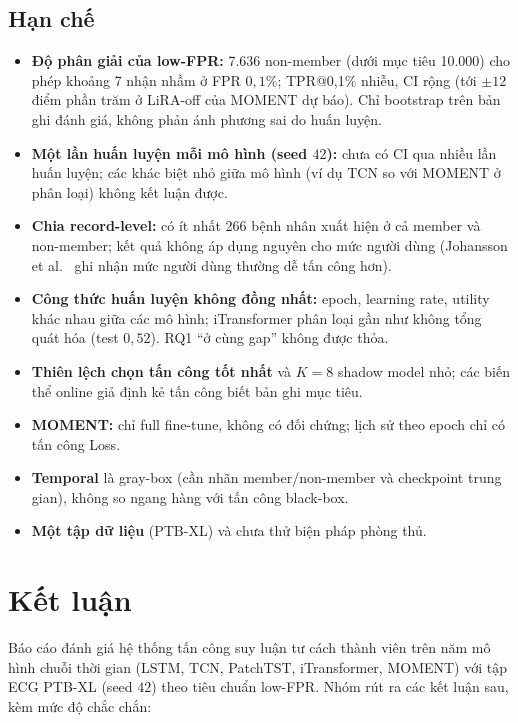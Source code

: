 \documentclass[12pt,a4paper]{report}
\begin{document}
\section{Hạn chế}
\label{sec:limitations}

\begin{itemize}
  \item \textbf{Độ phân giải của low-FPR:} 7.636 non-member (dưới mục tiêu 10.000) cho phép khoảng 7 nhận nhầm ở FPR $0{,}1\%$; TPR@0,1\% nhiễu, CI rộng (tới $\pm 12$ điểm phần trăm ở LiRA-off của MOMENT dự báo). Chỉ bootstrap trên bản ghi đánh giá, không phản ánh phương sai do huấn luyện.
  \item \textbf{Một lần huấn luyện mỗi mô hình (seed $42$):} chưa có CI qua nhiều lần huấn luyện; các khác biệt nhỏ giữa mô hình (ví dụ TCN so với MOMENT ở phân loại) không kết luận được.
  \item \textbf{Chia record-level:} có ít nhất 266 bệnh nhân xuất hiện ở cả member và non-member; kết quả không áp dụng nguyên cho mức người dùng (Johansson et al.\ \cite{johansson2025} ghi nhận mức người dùng thường dễ tấn công hơn).
  \item \textbf{Công thức huấn luyện không đồng nhất:} epoch, learning rate, utility khác nhau giữa các mô hình; iTransformer phân loại gần như không tổng quát hóa (test $0{,}52$). RQ1 ``ở cùng gap'' không được thỏa.
  \item \textbf{Thiên lệch chọn tấn công tốt nhất} và $K = 8$ shadow model nhỏ; các biến thể online giả định kẻ tấn công biết bản ghi mục tiêu.
  \item \textbf{MOMENT:} chỉ full fine-tune, không có đối chứng; lịch sử theo epoch chỉ có tấn công Loss.
  \item \textbf{Temporal} là gray-box (cần nhãn member/non-member và checkpoint trung gian), không so ngang hàng với tấn công black-box.
  \item \textbf{Một tập dữ liệu} (PTB-XL) và chưa thử biện pháp phòng thủ.
\end{itemize}

\chapter{Kết luận}
\label{chap:ketluan}

Báo cáo đánh giá hệ thống tấn công suy luận tư cách thành viên trên năm mô hình chuỗi thời gian (LSTM, TCN, PatchTST, iTransformer, MOMENT) với tập ECG PTB-XL (seed $42$) theo tiêu chuẩn low-FPR. Nhóm rút ra các kết luận sau, kèm mức độ chắc chắn:
\end{document}
